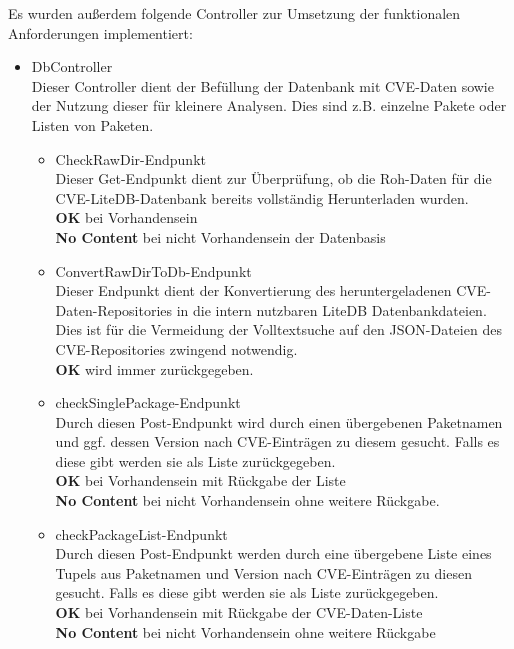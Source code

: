    Es wurden außerdem folgende Controller zur Umsetzung der funktionalen Anforderungen implementiert:
    \begin{itemize}
        \item DbController \\
            Dieser Controller dient der Befüllung der Datenbank mit \ac{CVE}-Daten sowie der Nutzung dieser für kleinere Analysen. Dies sind z.B. einzelne Pakete oder Listen von Paketen.
            \begin{itemize}
                \item CheckRawDir-Endpunkt \\
                    Dieser Get-Endpunkt dient zur Überprüfung, ob die Roh-Daten für die \ac{CVE}-LiteDB-Datenbank bereits vollständig Herunterladen wurden.
                    \\
                    \textbf{OK} bei Vorhandensein
                    \\
                    \textbf{No Content} bei nicht Vorhandensein der Datenbasis
                \item ConvertRawDirToDb-Endpunkt \\
                    Dieser Endpunkt dient der Konvertierung des heruntergeladenen \ac{CVE}-Daten-Repositories in die intern nutzbaren LiteDB Datenbankdateien.
                    Dies ist für die Vermeidung der Volltextsuche auf den \ac{JSON}-Dateien des \ac{CVE}-Repositories zwingend notwendig.
                    \\
                    \textbf{OK} wird immer zurückgegeben.
                \item checkSinglePackage-Endpunkt \\
                    Durch diesen Post-Endpunkt wird durch einen übergebenen Paketnamen und ggf. dessen Version nach \ac{CVE}-Einträgen zu diesem gesucht.
                    Falls es diese gibt werden sie als Liste zurückgegeben.
                    \\
                    \textbf{OK} bei Vorhandensein mit Rückgabe der Liste
                    \\
                    \textbf{No Content} bei nicht Vorhandensein ohne weitere Rückgabe.
                \item checkPackageList-Endpunkt \\
                    Durch diesen Post-Endpunkt werden durch eine übergebene Liste eines Tupels aus Paketnamen und Version nach \ac{CVE}-Einträgen zu diesen gesucht.
                    Falls es diese gibt werden sie als Liste zurückgegeben.
                    \\
                    \textbf{OK} bei Vorhandensein mit Rückgabe der \ac{CVE}-Daten-Liste
                    \\
                    \textbf{No Content} bei nicht Vorhandensein ohne weitere Rückgabe
            \end{itemize}


\end{itemize}
